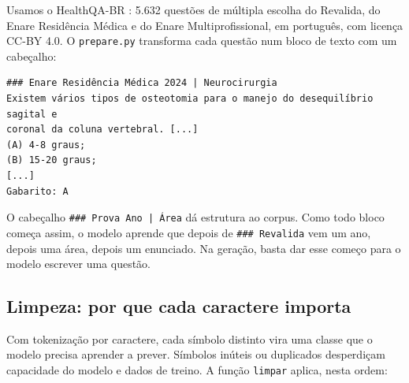 \documentclass[11pt,a4paper]{article}
\begin{document}
Usamos o HealthQA-BR \cite{healthqa}: 5.632 questões de múltipla escolha do Revalida, do Enare Residência Médica e do Enare Multiprofissional, em português, com licença CC-BY 4.0. O \texttt{prepare.py} transforma cada questão num bloco de texto com um cabeçalho:

\begin{lstlisting}[language={},basicstyle=\ttfamily\footnotesize]
### Enare Residência Médica 2024 | Neurocirurgia
Existem vários tipos de osteotomia para o manejo do desequilíbrio sagital e
coronal da coluna vertebral. [...]
(A) 4-8 graus;
(B) 15-20 graus;
[...]
Gabarito: A
\end{lstlisting}

O cabeçalho \texttt{\#\#\# Prova Ano | Área} dá estrutura ao corpus. Como todo bloco começa assim, o modelo aprende que depois de \texttt{\#\#\# Revalida} vem um ano, depois uma área, depois um enunciado. Na geração, basta dar esse começo para o modelo escrever uma questão.

\subsection{Limpeza: por que cada caractere importa}

Com tokenização por caractere, cada símbolo distinto vira uma classe que o modelo precisa aprender a prever. Símbolos inúteis ou duplicados desperdiçam capacidade do modelo e dados de treino. A função \texttt{limpar} aplica, nesta ordem:
\end{document}
